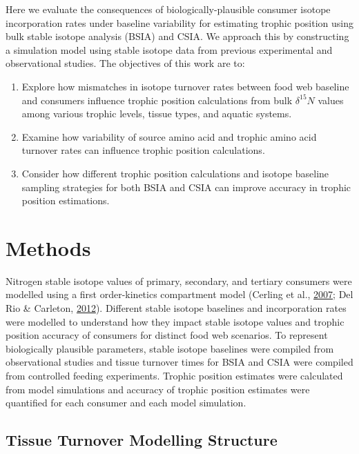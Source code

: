 \documentclass [11pt, proquest] {uwthesis}[2015/03/03]
\begin{document}
Here we evaluate the consequences of biologically-plausible consumer
isotope incorporation rates under baseline variability for estimating
trophic position using bulk stable isotope analysis (BSIA) and CSIA. We
approach this by constructing a simulation model using stable isotope
data from previous experimental and observational studies. The
objectives of this work are to:
\begin{enumerate}
\def\labelenumi{\arabic{enumi}.}
\item
  Explore how mismatches in isotope turnover rates between food web
  baseline and consumers influence trophic position calculations from
  bulk \(\delta^{15}N\) values among various trophic levels, tissue
  types, and aquatic systems.
\item
  Examine how variability of source amino acid and trophic amino acid
  turnover rates can influence trophic position calculations.
\item
  Consider how different trophic position calculations and isotope
  baseline sampling strategies for both BSIA and CSIA can improve
  accuracy in trophic position estimations.
\end{enumerate}
\section{Methods}\label{methods-4}

Nitrogen stable isotope values of primary, secondary, and tertiary
consumers were modelled using a first order-kinetics compartment model
(Cerling et al., \protect\hyperlink{ref-Cerling2007}{2007}; Del Rio \&
Carleton, \protect\hyperlink{ref-DelRio2012}{2012}). Different stable
isotope baselines and incorporation rates were modelled to understand
how they impact stable isotope values and trophic position accuracy of
consumers for distinct food web scenarios. To represent biologically
plausible parameters, stable isotope baselines were compiled from
observational studies and tissue turnover times for BSIA and CSIA were
compiled from controlled feeding experiments. Trophic position estimates
were calculated from model simulations and accuracy of trophic position
estimates were quantified for each consumer and each model simulation.

\subsection{Tissue Turnover Modelling
Structure}\label{tissue-turnover-modelling-structure}
\end{document}
